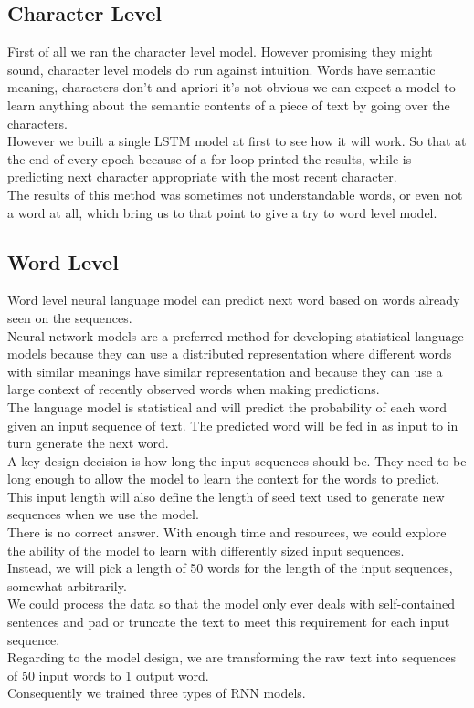 \documentclass[conference]{IEEEtran}
\begin{document}
\subsection{Character Level}

First of all we ran the character level model. However promising they might sound, character level models do run against intuition. Words have semantic meaning, characters don't and apriori it's not obvious we can expect a model to learn anything about the semantic contents of a piece of text by going over the characters.\\
However we built a single LSTM model at first to see how it will work. So that at the end of every epoch because of a for loop printed the results, while is predicting next character appropriate with the most recent character.\\
The results of this method was sometimes not understandable words, or even not a word at all, which bring us to that point to give a try to word level model.

\subsection{Word Level}

Word level neural language model can predict next word based on words already seen on the sequences.\\
Neural network models are a preferred method for developing statistical language models because they can use a distributed representation where different words with similar meanings have similar representation and because they can use a large context of recently observed words when making predictions.\\
The language model is statistical and will predict the probability of each word given an input sequence of text. The predicted word will be fed in as input to in turn generate the next word.\\
A key design decision is how long the input sequences should be. They need to be long enough to allow the model to learn the context for the words to predict. This input length will also define the length of seed text used to generate new sequences when we use the model.\\
There is no correct answer. With enough time and resources, we could explore the ability of the model to learn with differently sized input sequences.\\
Instead, we will pick a length of 50 words for the length of the input sequences, somewhat arbitrarily.\\
We could process the data so that the model only ever deals with self-contained sentences and pad or truncate the text to meet this requirement for each input sequence.\\
Regarding to the model design, we are transforming the raw text into sequences of 50 input words to 1 output word.\\
Consequently we trained three types of RNN models.
\end{document}
